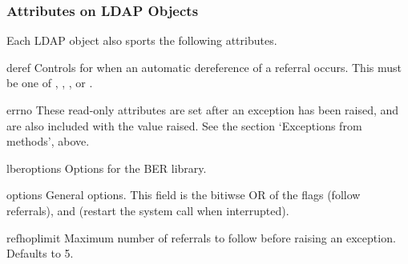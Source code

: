 
\subsubsection{Attributes on LDAP Objects}

Each LDAP object also sports the following attributes.


\begin{memberdesc}[int]{deref}
    Controls for when an automatic dereference of a referral occurs.
    This must be one of
    , , ,
    or .
\end{memberdesc}


\begin{memberdesc}[int]{errno}
    These read-only attributes are set after an exception has been raised, and
    are also included with the value raised. See the section
    `Exceptions from methods', above.
\end{memberdesc}


\begin{memberdesc}[int]{lberoptions}
    Options for the BER library.
\end{memberdesc}


\begin{memberdesc}[int]{options}
    General options. This field is the bitiwse OR of the flags
	 (follow referrals), and
	   (restart the  system call
			      when interrupted).
\end{memberdesc}


\begin{memberdesc}[int]{refhoplimit}
    Maximum number of referrals to follow before raising an exception.
    Defaults to 5.
\end{memberdesc}

